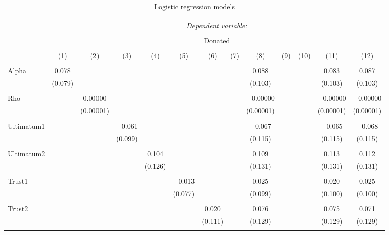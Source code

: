\begin{table}[H] \centering 
  \caption{Logistic regression models} 
  \label{} 
  \begin{adjustbox}{width=\textwidth}
  \begin{tabular}{@{\extracolsep{5pt}}lcccccccccccc} 
\\[-1.8ex]\hline 
\hline \\[-1.8ex] 
 & \multicolumn{12}{c}{\textit{Dependent variable:}} \\ 
\cline{2-13} 
\\[-1.8ex] & \multicolumn{12}{c}{Donated} \\ 
\\[-1.8ex] & (1) & (2) & (3) & (4) & (5) & (6) & (7) & (8) & (9) & (10) & (11) & (12)\\ 
\hline \\[-1.8ex] 
 Alpha & 0.078 &  &  &  &  &  &  & 0.088 &  &  & 0.083 & 0.087 \\ 
  & (0.079) &  &  &  &  &  &  & (0.103) &  &  & (0.103) & (0.103) \\ 
  & & & & & & & & & & & & \\ 
 Rho &  & 0.00000 &  &  &  &  &  & $-$0.00000 &  &  & $-$0.00000 & $-$0.00000 \\ 
  &  & (0.00001) &  &  &  &  &  & (0.00001) &  &  & (0.00001) & (0.00001) \\ 
  & & & & & & & & & & & & \\ 
 Ultimatum1 &  &  & $-$0.061 &  &  &  &  & $-$0.067 &  &  & $-$0.065 & $-$0.068 \\ 
  &  &  & (0.099) &  &  &  &  & (0.115) &  &  & (0.115) & (0.115) \\ 
  & & & & & & & & & & & & \\ 
 Ultimatum2 &  &  &  & 0.104 &  &  &  & 0.109 &  &  & 0.113 & 0.112 \\ 
  &  &  &  & (0.126) &  &  &  & (0.131) &  &  & (0.131) & (0.131) \\ 
  & & & & & & & & & & & & \\ 
 Trust1 &  &  &  &  & $-$0.013 &  &  & 0.025 &  &  & 0.020 & 0.025 \\ 
  &  &  &  &  & (0.077) &  &  & (0.099) &  &  & (0.100) & (0.100) \\ 
  & & & & & & & & & & & & \\ 
 Trust2 &  &  &  &  &  & 0.020 &  & 0.076 &  &  & 0.075 & 0.071 \\ 
  &  &  &  &  &  & (0.111) &  & (0.129) &  &  & (0.129) & (0.129) \\ 
  & & & & & & & & & & & & \\ 

\end{tabular}
\end{adjustbox}
\end{table}
